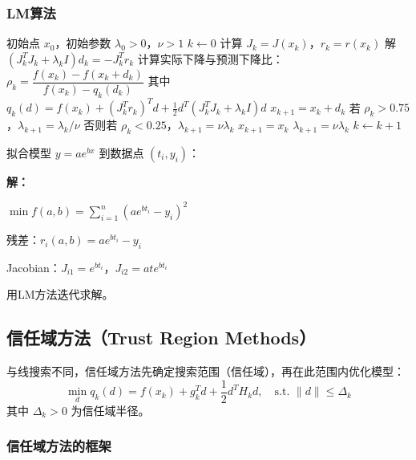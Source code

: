 \subsubsection{LM算法}

\begin{algorithm}[H]
\caption{Levenberg-Marquardt方法}
\begin{algorithmic}[1]
\Require 初始点 $x_0$，初始参数 $\lambda_0 > 0$，$\nu > 1$
\State $k \gets 0$
    \State 计算 $J_k = J(x_k)$，$r_k = r(x_k)$
    \State 解 $(J_k^T J_k + \lambda_k I) d_k = -J_k^T r_k$
    \State 计算实际下降与预测下降比：
    \State $\rho_k = \dfrac{f(x_k) - f(x_k + d_k)}{f(x_k) - q_k(d_k)}$
    \State 其中 $q_k(d) = f(x_k) + (J_k^T r_k)^T d + \frac{1}{2}d^T(J_k^T J_k + \lambda_k I)d$
        \State $x_{k+1} = x_k + d_k$
        \State 若 $\rho_k > 0.75$，$\lambda_{k+1} = \lambda_k / \nu$
        \State 否则若 $\rho_k < 0.25$，$\lambda_{k+1} = \nu \lambda_k$
    \Else
        \State $x_{k+1} = x_k$
        \State $\lambda_{k+1} = \nu \lambda_k$
    \EndIf
    \State $k \gets k + 1$
\EndWhile
\end{algorithmic}
\end{algorithm}

\begin{example}[曲线拟合]
拟合模型 $y = ae^{bx}$ 到数据点 $(t_i, y_i)$：

\textbf{解：}

$\min f(a,b) = \sum_{i=1}^{n} (ae^{bt_i} - y_i)^2$

残差：$r_i(a,b) = ae^{bt_i} - y_i$

Jacobian：$J_{i1} = e^{bt_i}$，$J_{i2} = ate^{bt_i}$

用LM方法迭代求解。
\end{example}

\subsection{信任域方法（Trust Region Methods）}\label{sec:trust-region}

\begin{conceptbox}[信任域方法]
与线搜索不同，信任域方法先确定搜索范围（信任域），再在此范围内优化模型：
\[
\min_d q_k(d) = f(x_k) + g_k^T d + \frac{1}{2}d^T H_k d, \quad \text{s.t. } \|d\| \leq \Delta_k
\]
其中 $\Delta_k > 0$ 为信任域半径。
\end{conceptbox}

\subsubsection{信任域方法的框架}


